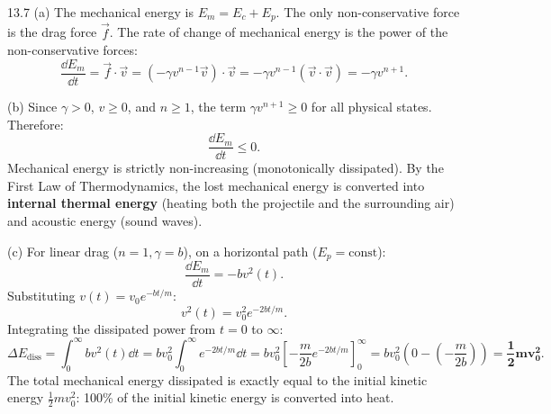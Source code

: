 \begin{tabletworkspace}[5.5cm]
\end{tabletworkspace}

\begin{solution}{13.7}
(a) The mechanical energy is $E_m = E_c + E_p$.
The only non-conservative force is the drag force $\vec{f}$.
The rate of change of mechanical energy is the power of the non-conservative forces:
\[
\frac{\dd E_m}{\dd t} = \vec{f}\cdot\vec{v} = \left(-\gamma v^{n-1}\vec{v}\right)\cdot\vec{v} = -\gamma v^{n-1}(\vec{v}\cdot\vec{v}) = \boxed{-\gamma v^{n+1}.}
\]

(b) Since $\gamma > 0$, $v \ge 0$, and $n \ge 1$, the term $\gamma v^{n+1} \ge 0$ for all physical states.
Therefore:
\[
\frac{\dd E_m}{\dd t} \le 0.
\]
Mechanical energy is strictly non-increasing (monotonically dissipated).
By the First Law of Thermodynamics, the lost mechanical energy is converted into \textbf{internal thermal energy} (heating both the projectile and the surrounding air) and acoustic energy (sound waves).

(c) For linear drag ($n=1, \gamma=b$), on a horizontal path ($E_p = \text{const}$):
\[
\frac{\dd E_m}{\dd t} = -b v^2(t).
\]
Substituting $v(t) = v_0 e^{-bt/m}$:
\[
v^2(t) = v_0^2 e^{-2bt/m}.
\]
Integrating the dissipated power from $t=0$ to $\infty$:
\[
\Delta E_{\text{diss}} = \int_0^\infty b v^2(t)\dd t = b v_0^2 \int_0^\infty e^{-2bt/m}\dd t = b v_0^2 \left[ -\frac{m}{2b}e^{-2bt/m} \right]_0^\infty = b v_0^2\left(0 - \left(-\frac{m}{2b}\right)\right) = \mathbf{\frac{1}{2}m v_0^2.}
\]
The total mechanical energy dissipated is exactly equal to the initial kinetic energy $\frac{1}{2}m v_0^2$: 100\% of the initial kinetic energy is converted into heat.
\end{solution}
